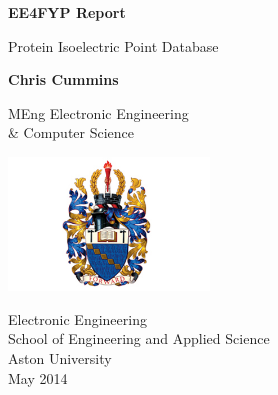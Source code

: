 %
%
%
\begin{titlepage}
  \begin{center}
    \vspace*{1cm}

    \Huge
    \textbf{EE4FYP Report}

    \vspace{0.5cm}
    \LARGE
    Protein Isoelectric Point Database

    \vspace{1.5cm}

    \textbf{Chris Cummins}

    \vfill

    MEng Electronic Engineering\\
    \& Computer Science

    \vspace{0.8cm}

    \includegraphics[width=0.4\textwidth]{assets/aston.jpeg}

    \Large
    Electronic Engineering\\
    School of Engineering and Applied Science\\
    Aston University\\
    May 2014

  \end{center}
\end{titlepage}
